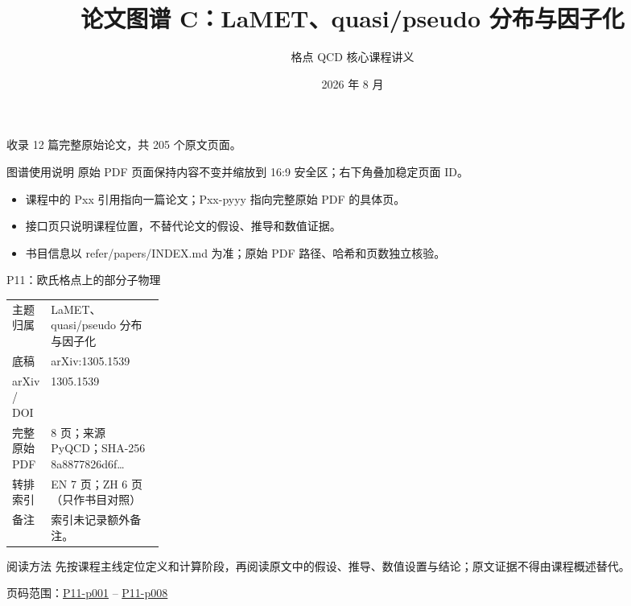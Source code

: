 \documentclass[aspectratio=169,10pt]{ctexbeamer}
\title{论文图谱 C：LaMET、quasi/\allowbreak{}pseudo 分布与因子化}
\author{格点 QCD 核心课程讲义}
\date{2026 年 8 月}
\begin{document}
\begin{frame}[plain]\titlepage
\vfill\centering 收录 12 篇完整原始论文，共 205 个原文页面。
\end{frame}
\begin{frame}[t]{图谱使用说明}
\small 原始 PDF 页面保持内容不变并缩放到 16:9 安全区；右下角叠加稳定页面 ID。
\begin{itemize}
\item 课程中的 Pxx 引用指向一篇论文；Pxx-pyyy 指向完整原始 PDF 的具体页。
\item 接口页只说明课程位置，不替代论文的假设、推导和数值证据。
\item 书目信息以 refer/papers/INDEX.md 为准；原始 PDF 路径、哈希和页数独立核验。
\end{itemize}\end{frame}
\begin{frame}[t]{P11：欧氏格点上的部分子物理}
\small\begin{tabularx}{\linewidth}{p{0.22\linewidth}Y}
\toprule 主题归属 & LaMET、quasi/\allowbreak{}pseudo 分布与因子化\\
底稿 & arXiv:1305.1539\\
arXiv / DOI & 1305.1539\\
完整原始 PDF & 8 页；来源 PyQCD；SHA-256 8a8877826d6f\ldots\\
转排索引 & EN 7 页；ZH 6 页（只作书目对照）\\
备注 & 索引未记录额外备注。\\
\bottomrule\end{tabularx}\vspace{0.25cm}
\begin{block}{阅读方法}
先按课程主线定位定义和计算阶段，再阅读原文中的假设、推导、数值设置与结论；原文证据不得由课程概述替代。
\end{block}
\vfill 页码范围：\hyperlink{P11-p001}{P11-p001} -- \hyperlink{P11-p008}{P11-p008}
\end{frame}
\end{document}
